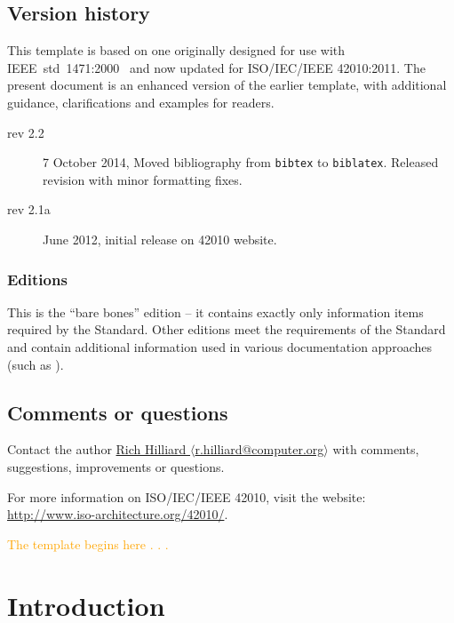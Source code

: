 \documentclass[10pt,oneside]{report}
\begin{document}
\section*{Version history}

This template is based on one originally designed for use with
IEEE~std~1471:2000~\cite{IEEE1471:2000} and now updated for
ISO/IEC/IEEE 42010:2011.  The present document is an enhanced version
of the earlier template, with additional guidance, clarifications and
examples for readers.

\begin{description}
\item[rev 2.2] 7 October 2014, Moved bibliography from \texttt{bibtex}
  to \texttt{biblatex}. Released revision with minor formatting fixes.
\item[rev 2.1a] June 2012, initial release on 42010 website.
\end{description}


\subsection*{Editions} 
This is the ``bare bones'' edition -- it contains exactly only
information items required by the Standard. Other editions meet the
requirements of the Standard and contain additional information used
in various documentation approaches (such as
\cite{Rozanski-Woods:2011,DSA:2010}).


\section*{Comments or questions}
 
Contact the author \href{mailto:r.hilliard@computer.org}%
{Rich Hilliard $\langle$r.hilliard@computer.org$\rangle$} with
comments, suggestions, improvements or questions.

For more information on ISO/IEC/IEEE 42010, visit the website: \\
\url{http://www.iso-architecture.org/42010/}.

\textcolor{Orange}{\Large The template begins here . . .}



\chapter{Introduction}\label{ad:info}
\end{document}

